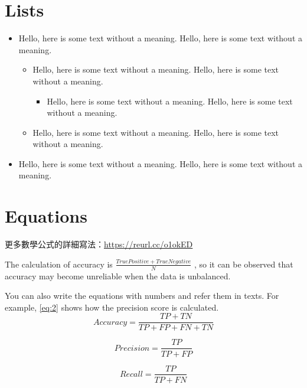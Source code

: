 \section{Lists}
    \begin{itemize}
    \item Hello, here is some text without a meaning. Hello, here is some text without a meaning.
       \begin{itemize}
          \item Hello, here is some text without a meaning. Hello, here is some text without a meaning.
            \begin{itemize}
            \item Hello, here is some text without a meaning. Hello, here is some text without a meaning.
            \end{itemize}
       \item Hello, here is some text without a meaning. Hello, here is some text without a meaning.
       \end{itemize}
    \item Hello, here is some text without a meaning. Hello, here is some text without a meaning.
    \end{itemize}

\section{Equations}

更多數學公式的詳細寫法：\href{https://reurl.cc/o1okED}{https://reurl.cc/o1okED}

The calculation of accuracy is 
\begin{math}
\frac{True Positive + True Negative}{N}
\end{math} %
, so it can be observed that accuracy may become unreliable when the data is unbalanced.\par

You can also write the equations with numbers and refer them in texts. For example, \autoref{eq:2} shows how the precision score is calculated. 
\begin{equation} %
    Accuracy = \frac{TP+TN}{TP+FP+FN+TN}
    \label{eq:1}
\end{equation}

\begin{equation}
    Precision = \frac{TP}{TP+FP}
    \label{eq:2}
\end{equation}

\begin{equation}
    Recall = \frac{TP}{TP+FN}
    \label{eq:3}
\end{equation}


